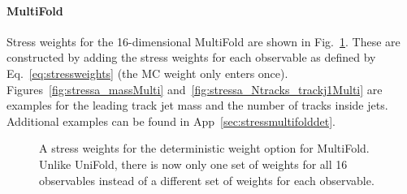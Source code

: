 \documentclass[NOTE, atlasdraft=true, texlive=2016, UKenglish]{\ATLASLATEXPATH atlasdoc}
\begin{document}
\clearpage

\paragraph{MultiFold} Stress weights for the 16-dimensional MultiFold are shown in Fig.~\ref{fig:stressa_weightsMulti}.  These are constructed by adding the stress weights for each observable as defined by Eq.~\ref{eq:stressweights} (the MC weight only enters once).  Figures~\ref{fig:stressa_massMulti} and~\ref{fig:stressa_Ntracks_trackj1Multi} are examples for the leading track jet mass and the number of tracks inside jets.  Additional examples can be found in App~\ref{sec:stressmultifolddet}.

\begin{figure}[h!]
\centering
{}
\caption{A stress weights for the deterministic weight option for MultiFold.  Unlike UniFold, there is now only one set of weights for all 16 observables instead of a different set of weights for each observable.}
\label{fig:stressa_weightsMulti}
\end{figure}
\end{document}
